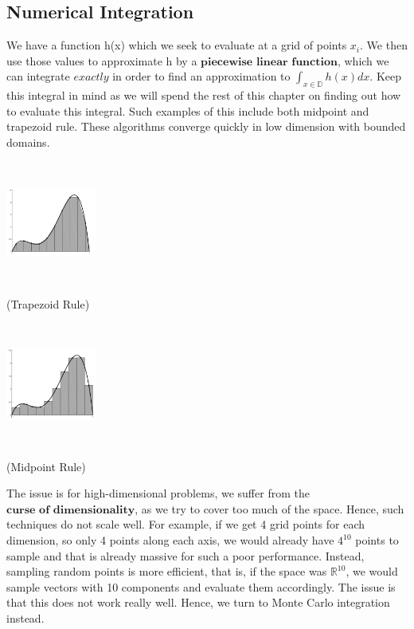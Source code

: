 \documentclass[twoside]{article}
\begin{document}
\subsection{Numerical Integration}
We have a function h(x) which we seek to evaluate at a grid of points $x_i$. We then use those values to approximate h by a $\textbf{piecewise linear function}$, which we can integrate $\textit{exactly}$ in order to find an approximation to $\int_{x \in \mathbb{D}}h(x)dx$. Keep this integral in mind as we will spend the rest of this chapter on finding out how to evaluate this integral. Such examples of this include both midpoint and trapezoid rule. These algorithms converge quickly in low dimension with bounded domains.
\begin{center}
\includegraphics[width=3cm, height=4cm]{assets/trapezoid.png}

(Trapezoid Rule)
\end{center}
\begin{center}
\includegraphics[width=3cm, height=4cm]{assets/midpoint.png}

(Midpoint Rule)
\end{center}

The issue is for high-dimensional problems, we suffer from the $\textbf{curse of dimensionality}$, as we try to cover too much of the space. Hence, such techniques do not scale well. For example, if we get 4 grid points for each dimension, so only 4 points along each axis, we would already have $4^{10}$ points to sample and that is already massive for such a poor performance. Instead, sampling random points is more efficient, that is, if the space was $\mathbb{R}^{10}$, we would sample vectors with 10 components and evaluate them accordingly. The issue is that this does not work really well. Hence, we turn to Monte Carlo integration instead.
\end{document}
